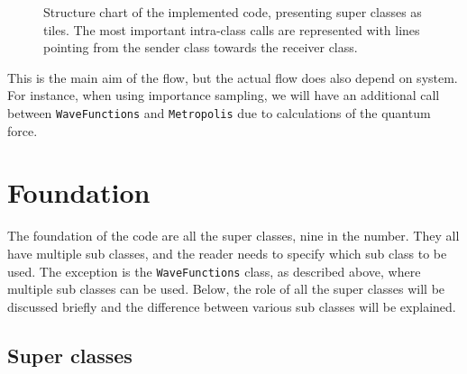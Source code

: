 \begin{figure} [h]
	\caption{Structure chart of the implemented code, presenting super classes as tiles. The most important intra-class calls are represented with lines pointing from the sender class towards the receiver class.}
\end{figure}

This is the main aim of the flow, but the actual flow does also depend on system. For instance, when using importance sampling, we will have an additional call between \texttt{WaveFunctions} and \texttt{Metropolis} due to calculations of the quantum force. 

\section{Foundation} \label{subsec:foundation}
The foundation of the code are all the super classes, nine in the number. They all have multiple sub classes, and the reader needs to specify which sub class to be used. The exception is the \texttt{WaveFunctions} class, as described above, where multiple sub classes can be used. Below, the role of all the super classes will be discussed briefly and the difference between various sub classes will be explained. 

\subsection{Super classes}

